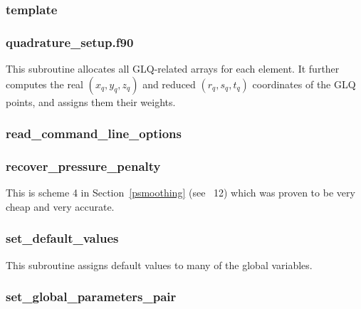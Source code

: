  \subsubsection{template}

 \subsubsection{quadrature\_setup.f90}
 This subroutine allocates all GLQ-related arrays for each element.
 It further computes the real $(x_q,y_q,z_q)$ and reduced $(r_q,s_q,t_q)$
 coordinates of the GLQ points, and assigns them their weights.
 \subsubsection{read\_command\_line\_options}

 \subsubsection{recover\_pressure\_penalty}
 This is scheme 4 in Section~\ref{psmoothing} (see \stone~12) which was proven to be 
 very cheap and very accurate. 
 \subsubsection{set\_default\_values}
 This subroutine assigns default values to many of the global variables.
 \subsubsection{set\_global\_parameters\_pair}

